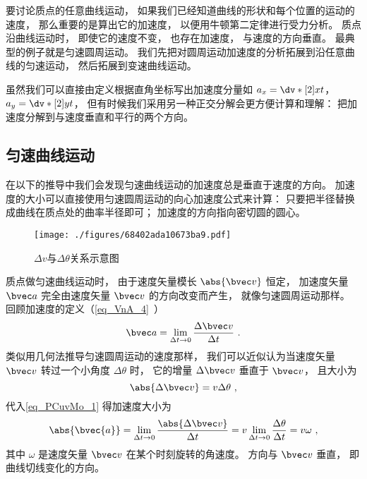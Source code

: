 

要讨论质点的任意曲线运动， 如果我们已经知道曲线的形状和每个位置的运动的速度， 那么重要的是算出它的加速度， 以便用牛顿第二定律进行受力分析。 质点沿曲线运动时， 即使它的速度不变， 也存在加速度， 与速度的方向垂直。 最典型的例子就是匀速圆周运动。 我们先把对圆周运动加速度的分析拓展到沿任意曲线的匀速运动， 然后拓展到变速曲线运动。

虽然我们可以直接由定义根据直角坐标写出加速度分量如 $a_x = \dv*[2]{x}{t}$， $a_y = \dv*[2]{y}{t}$， 但有时候我们采用另一种正交分解会更方便计算和理解： 把加速度分解到与速度垂直和平行的两个方向。

\subsection{匀速曲线运动}
在以下的推导中我们会发现匀速曲线运动的加速度总是垂直于速度的方向。 加速度的大小可以直接使用匀速圆周运动的向心加速度公式来计算： 只要把半径替换成曲线在质点处的曲率半径即可； 加速度的方向指向密切圆的圆心。
\begin{figure}[ht]
\centering
\texttt{[image: ./figures/68402ada10673ba9.pdf]}
\caption{$\Delta v$与$\Delta \theta$关系示意图} \label{fig_PCuvMo_1}
\end{figure}

质点做匀速曲线运动时， 由于速度矢量模长 $\abs{\bvec v}$ 恒定， 加速度矢量 $\bvec a$ 完全由速度矢量 $\bvec v$ 的方向改变而产生， 就像匀速圆周运动那样。 回顾加速度的定义（\autoref{eq_VnA_4}~）
\begin{equation}\label{eq_PCuvMo_2}
\bvec a = \lim_{\Delta t \to 0} \frac{\Delta \bvec v}{\Delta t}~.
\end{equation}
类似用几何法推导匀速圆周运动的速度那样， 我们可以近似认为当速度矢量 $\bvec v$ 转过一个小角度 $\Delta \theta$ 时， 它的增量 $\Delta \bvec v$ 垂直于 $\bvec v$， 且大小为
\begin{equation}\label{eq_PCuvMo_1}
\abs{\Delta \bvec v} = v\Delta\theta~,
\end{equation}
代入\autoref{eq_PCuvMo_1} 得加速度大小为
\begin{equation}\label{eq_PCuvMo_4}
\abs{\bvec{a}} = \lim_{\Delta t \to 0} \frac{\abs{\Delta \bvec v}}{\Delta t}
= v\lim_{\Delta t \to 0}\frac{\Delta \theta}{\Delta t} = v\omega~,
\end{equation}
其中 $\omega$ 是速度矢量 $\bvec v$ 在某个时刻旋转的角速度。 方向与 $\bvec v$ 垂直， 即曲线切线变化的方向。

